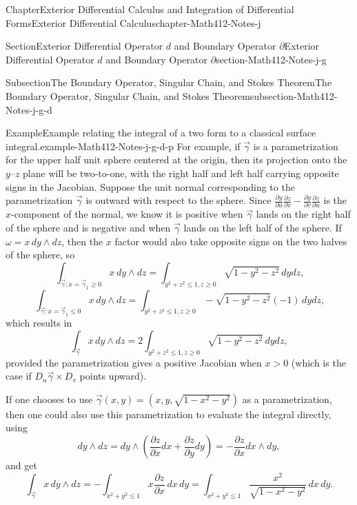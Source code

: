 \documentclass[oneside,10pt,]{book}
\numberwithin{equation}{section}
\newcommand{\vg}{{\vec{\gamma}}}
\begin{document}
\begin{chapterptx}{Chapter}{Exterior Differential Calculus and Integration of Differential Forms}{}{Exterior Differential Calculus}{}{}{chapter-Math412-Notes-j}
\begin{sectionptx}{Section}{Exterior Differential Operator \(d\) and Boundary Operator \(\partial\)}{}{Exterior Differential Operator \(d\) and Boundary Operator \(\partial\)}{}{}{section-Math412-Notes-j-g}
\begin{subsectionptx}{Subsection}{The Boundary Operator, Singular Chain, and Stokes Theorem}{}{The Boundary Operator, Singular Chain, and Stokes Theorem}{}{}{subsection-Math412-Notes-j-g-d}
\begin{example}{Example}{Example relating the integral of a two form to a classical surface integral.}{example-Math412-Notes-j-g-d-p}
For example, if \(\vg\) is a parametrization for the upper half unit sphere centered at the origin, then its projection onto the \(y\mbox{--}z\) plane will be two-to-one, with the right half and left half carrying opposite signs in the Jacobian. Suppose the unit normal corresponding to the parametrization \(\vg\) is outward with respect to the sphere. Since  \(\frac{\partial y}{\partial u} \frac{\partial z}{\partial v}- 
\frac{\partial y}{\partial v} \frac{\partial z}{\partial u}\) is the \(x\)-component of the normal, we know it is positive when \(\vg\) lands on the right half of the sphere and is negative  and when \(\vg\) lands on the left half of the sphere. If \(\omega=x\, dy\wedge dz\), then the \(x\) factor would also take opposite signs on the two halves of the sphere, so%
\begin{equation*}
\int_{\vg: x=\vg_{1}\ge 0} x\, dy\wedge dz =\int_{y^{2}+z^{2}\le 1, z\ge 0} \sqrt{1-y^{2}-z^{2}}\, dy dz\text{,}
\end{equation*}
%
\begin{equation*}
\int_{\vg: x=\vg_{1}\le 0} x\, dy\wedge dz =\int_{y^{2}+z^{2}\le 1, z\ge 0} -\sqrt{1-y^{2}-z^{2}} (-1)\, dy dz\text{,}
\end{equation*}
which results in%
\begin{equation*}
\int_{\vg}x\, dy\wedge dz=2 \int_{y^{2}+z^{2}\le 1, z\ge 0} \sqrt{1-y^{2}-z^{2}}\, dy dz,
\end{equation*}
provided the parametrization gives a positive Jacobian when \(x >0\) (which is the case if \(D_{u}\vg\times D_{v}\) points upward).%
\par
If one chooses to use \(\vg(x,y)=(x,y, \sqrt{1-x^{2}-y^{2}})\) as a parametrization, then one could also use this parametrization to evaluate the integral directly, using%
\begin{equation*}
dy\wedge dz= dy\wedge (\frac{\partial z}{\partial x}dx + \frac{\partial z}{\partial y}dy)=-
\frac{\partial z}{\partial x}dx\wedge dy,
\end{equation*}
and get%
\begin{equation*}
\int_{\vg}x\, dy\wedge dz= - \int_{x^{2}+y^{2}\le 1} x \frac{\partial z}{\partial x}\,dx\, dy
=\int_{x^{2}+y^{2}\le 1}\frac{x^{2}}{\sqrt{1-x^{2}-y^{2}}} \,dx\, dy.
\end{equation*}
%
\par

\end{example}
\end{subsectionptx}
\end{sectionptx}
\end{chapterptx}
\end{document}

